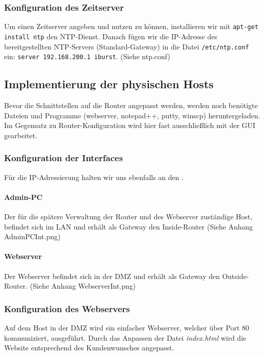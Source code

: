 \subsubsection{Konfiguration des Zeitserver}
\label{subsubsec:KonfigurationLinuxNTP}
Um einen Zeitserver angeben und nutzen zu können, installieren wir mit \verb+apt-get install ntp+ den \ac{NTP}-Dienst. Danach fügen wir die \ac{IP}-Adresse des bereitgestellten \ac{NTP}-Servers (Standard-Gateway) in die Datei \verb+/etc/ntp.conf+ ein: \verb+server 192.168.200.1 iburst+. (Siehe ntp.conf)


\subsection{Implementierung der physischen Hosts}
\label{subsec:ImplementierungHosts}
Bevor die Schnittstellen auf die Router angepasst werden, werden noch \evtl benötigte Dateien und Programme (webserver, notepad++, putty, winscp) heruntergeladen. Im Gegensatz zu Router-Konfiguration wird hier fast ausschließlich mit der \ac{GUI} gearbeitet.

\subsubsection{Konfiguration der Interfaces}
\label{subsubsec:KonfigurationHostInt}
Für die \ac{IP}-Adressierung halten wir uns ebenfalls an den .

\paragraph*{Admin-\ac{PC}} Der für die spätere Verwaltung der Router und des Webserver zuständige Host, befindet sich im \ac{LAN} und erhält als Gateway den Inside-Router (Siehe Anhang AdminPCInt.png)

\paragraph*{Webserver} Der Webserver befindet sich in der \ac{DMZ} und erhält als Gateway den Outside-Router. (Siehe Anhang WebserverInt.png)

\subsubsection{Konfiguration des Webservers}
\label{subsubsec:KonfigurationWebserver}
Auf dem Host in der \ac{DMZ} wird ein einfacher Webserver, welcher über Port 80 kommuniziert, ausgeführt. Durch das Anpassen der Datei \textit{index.html} wird die Website entsprechend des Kundenwunsches angepasst.

